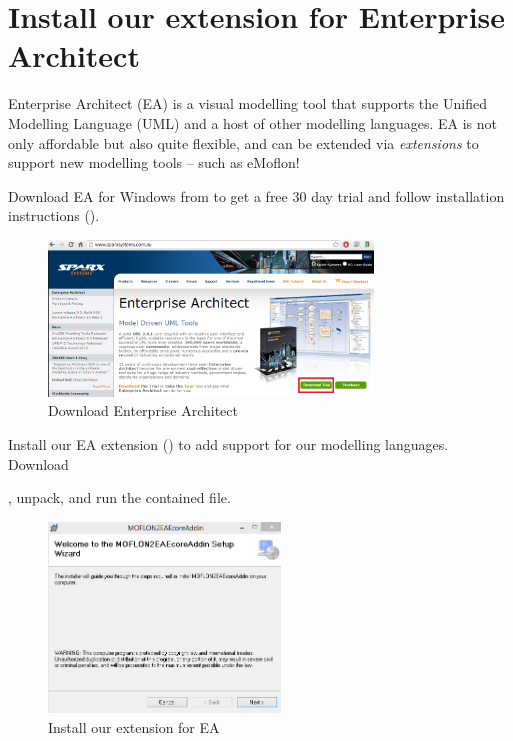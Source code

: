\newpage

\genHeader
\section{Install our extension for Enterprise Architect}

Enterprise Architect (EA) is a visual modelling tool that supports the Unified Modelling Language (UML) and a host of other modelling languages.
EA is not only affordable but also quite flexible, and can be extended via \emph{extensions} to support new modelling tools -- such as eMoflon!

\begin{stepbystep}
\item Download\hypertarget{installEA vis}{} EA for Windows from  to get a free 30 day trial and follow
installation instructions ().

\begin{figure}[htbp]
	\centering
  	\includegraphics[width=0.77\textwidth]{../../org.moflon.doc.handbook.01_installation/1_installation/installEA/iea_images/ea_download}
	\caption{Download Enterprise Architect}
	\label{enterpriseArchitextHomepage}
\end{figure} 

\item Install our EA extension () to add support for our modelling languages.
Download 

{\footnotesize \eMoflonEAAddin}

, unpack, and run the contained  file.

\begin{figure}[htbp]
	\centering
  \includegraphics[width=0.55\textwidth]{../../org.moflon.doc.handbook.01_installation/1_installation/installEA/iea_images/eaplugin_install}
	\caption{Install our extension for EA}
	\label{eaPluginWizard}
\end{figure}
\end{stepbystep}